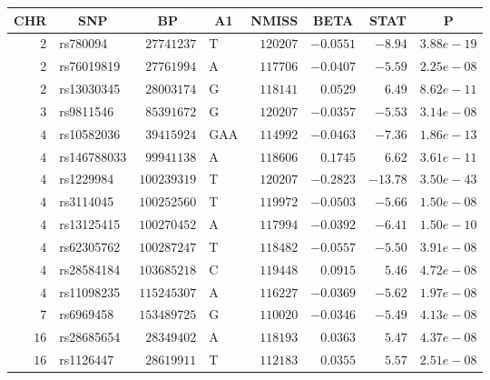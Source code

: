 \begin{center}
\begin{tabular}{rlrlrrrr}
\hline\hline
\multicolumn{1}{c}{CHR}&\multicolumn{1}{c}{SNP}&\multicolumn{1}{c}{BP}&\multicolumn{1}{c}{A1}&\multicolumn{1}{c}{NMISS}&\multicolumn{1}{c}{BETA}&\multicolumn{1}{c}{STAT}&\multicolumn{1}{c}{P}\tabularnewline
\hline
$ 2$&rs780094&$ 27741237$&T&$120207$&$-0.0551$&$ -8.94$&$3.88e-19$\tabularnewline
$ 2$&rs76019819&$ 27761994$&A&$117706$&$-0.0407$&$ -5.59$&$2.25e-08$\tabularnewline
$ 2$&rs13030345&$ 28003174$&G&$118141$&$ 0.0529$&$  6.49$&$8.62e-11$\tabularnewline
$ 3$&rs9811546&$ 85391672$&G&$120207$&$-0.0357$&$ -5.53$&$3.14e-08$\tabularnewline
$ 4$&rs10582036&$ 39415924$&GAA&$114992$&$-0.0463$&$ -7.36$&$1.86e-13$\tabularnewline
$ 4$&rs146788033&$ 99941138$&A&$118606$&$ 0.1745$&$  6.62$&$3.61e-11$\tabularnewline
$ 4$&rs1229984&$100239319$&T&$120207$&$-0.2823$&$-13.78$&$3.50e-43$\tabularnewline
$ 4$&rs3114045&$100252560$&T&$119972$&$-0.0503$&$ -5.66$&$1.50e-08$\tabularnewline
$ 4$&rs13125415&$100270452$&A&$117994$&$-0.0392$&$ -6.41$&$1.50e-10$\tabularnewline
$ 4$&rs62305762&$100287247$&T&$118482$&$-0.0557$&$ -5.50$&$3.91e-08$\tabularnewline
$ 4$&rs28584184&$103685218$&C&$119448$&$ 0.0915$&$  5.46$&$4.72e-08$\tabularnewline
$ 4$&rs11098235&$115245307$&A&$116227$&$-0.0369$&$ -5.62$&$1.97e-08$\tabularnewline
$ 7$&rs6969458&$153489725$&G&$110020$&$-0.0346$&$ -5.49$&$4.13e-08$\tabularnewline
$16$&rs28685654&$ 28349402$&A&$118193$&$ 0.0363$&$  5.47$&$4.37e-08$\tabularnewline
$16$&rs1126447&$ 28619911$&T&$112183$&$ 0.0355$&$  5.57$&$2.51e-08$\tabularnewline
\hline
\end{tabular}\end{center}
